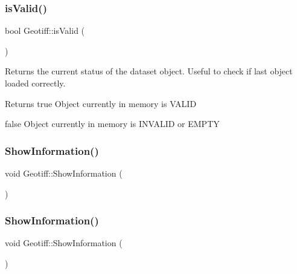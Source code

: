 \mbox{\label{class_geotiff_a89fbf267a0d1afe1c1773201d359f3fa}} 
\subsubsection{\texorpdfstring{is\+Valid()}{isValid()}\hspace{0.1cm}{\footnotesize\ttfamily [2/2]}}
{\footnotesize\ttfamily bool Geotiff\+::is\+Valid (\begin{DoxyParamCaption}{ }\end{DoxyParamCaption})}



Returns the current status of the dataset object. Useful to check if last object loaded correctly. 

\begin{DoxyReturn}{Returns}
true Object currently in memory is V\+A\+L\+ID 

false Object currently in memory is I\+N\+V\+A\+L\+ID or E\+M\+P\+TY 
\end{DoxyReturn}
\mbox{\label{class_geotiff_a14b4f3434d6d06f5b50b51ba8ebdf0d3}} 
\subsubsection{\texorpdfstring{Show\+Information()}{ShowInformation()}\hspace{0.1cm}{\footnotesize\ttfamily [1/2]}}
{\footnotesize\ttfamily void Geotiff\+::\+Show\+Information (\begin{DoxyParamCaption}{ }\end{DoxyParamCaption})}

\mbox{\label{class_geotiff_a14b4f3434d6d06f5b50b51ba8ebdf0d3}} 
\subsubsection{\texorpdfstring{Show\+Information()}{ShowInformation()}\hspace{0.1cm}{\footnotesize\ttfamily [2/2]}}
{\footnotesize\ttfamily void Geotiff\+::\+Show\+Information (\begin{DoxyParamCaption}{ }\end{DoxyParamCaption})}



